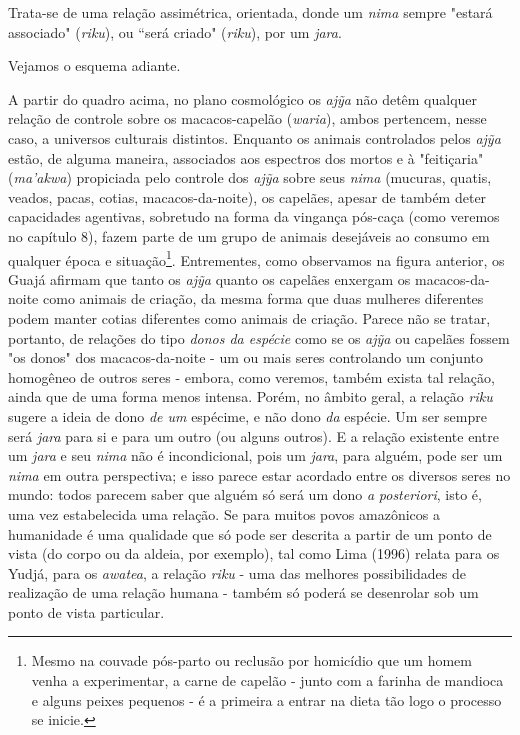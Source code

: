 Trata-se de uma relação assimétrica, orientada, donde um \emph{nima}
sempre "estará associado" (\emph{riku}), ou ``será criado"
(\emph{riku}), por um \emph{jara}.

Vejamos o esquema adiante.



A partir do quadro acima, no plano cosmológico os \emph{ajỹa} não detêm
qualquer relação de controle sobre os macacos-capelão (\emph{waria}),
ambos pertencem, nesse caso, a universos culturais distintos. Enquanto
os animais controlados pelos \emph{ajỹa} estão, de alguma maneira,
associados aos espectros dos mortos e à "feitiçaria" (\emph{ma'akwa})
propiciada pelo controle dos \emph{ajỹa} sobre seus \emph{nima}
(mucuras, quatis, veados, pacas, cotias, macacos-da-noite), os capelães,
apesar de também deter capacidades agentivas, sobretudo na forma da
vingança pós-caça (como veremos no capítulo 8), fazem parte de um grupo
de animais desejáveis ao consumo em qualquer época e situação\footnote{Mesmo
  na couvade pós-parto ou reclusão por homicídio que um homem venha a
  experimentar, a carne de capelão - junto com a farinha de mandioca e
  alguns peixes pequenos - é a primeira a entrar na dieta tão logo o
  processo se inicie.}. Entrementes, como observamos na figura anterior,
os Guajá afirmam que tanto os \emph{ajỹa} quanto os capelães enxergam os
macacos-da-noite como animais de criação, da mesma forma que duas
mulheres diferentes podem manter cotias diferentes como animais de
criação. Parece não se tratar, portanto, de relações do tipo \emph{donos
da espécie} como se os \emph{ajỹa} ou capelães fossem "os donos" dos
macacos-da-noite - um ou mais seres controlando um conjunto homogêneo de
outros seres - embora, como veremos, também exista tal relação, ainda
que de uma forma menos intensa. Porém, no âmbito geral, a relação
\emph{riku} sugere a ideia de dono \emph{de um} espécime, e não dono
\emph{da} espécie. Um ser sempre será \emph{jara} para si e para um
outro (ou alguns outros). E a relação existente entre um \emph{jara} e
seu \emph{nima} não é incondicional, pois um \emph{jara}, para alguém,
pode ser um \emph{nima} em outra perspectiva; e isso parece estar
acordado entre os diversos seres no mundo: todos parecem saber que
alguém só será um dono \emph{a} \emph{posteriori}, isto é, uma vez
estabelecida uma relação. Se para muitos povos amazônicos a humanidade é
uma qualidade que só pode ser descrita a partir de um ponto de vista (do
corpo ou da aldeia, por exemplo), tal como Lima (1996) relata para os
Yudjá, para os \emph{awatea}, a relação \emph{riku} - uma das melhores
possibilidades de realização de uma relação humana - também só poderá se
desenrolar sob um ponto de vista particular.

